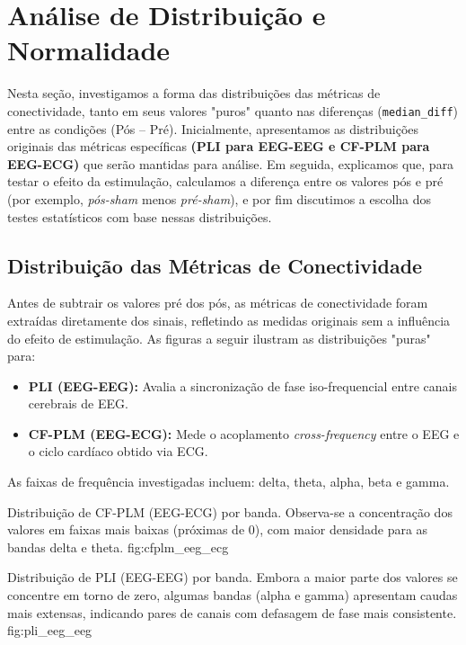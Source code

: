 \chapter{Análise de Distribuição e Normalidade}
\label{chap:analise_distribuicao_normalidade}

Nesta seção, investigamos a forma das distribuições das métricas de conectividade, tanto em seus valores "puros" quanto nas diferenças (\texttt{median\_diff}) entre as condições (Pós – Pré). Inicialmente, apresentamos as distribuições originais das métricas específicas \textbf{(PLI para EEG-EEG e CF-PLM para EEG-ECG)} que serão mantidas para análise. Em seguida, explicamos que, para testar o efeito da estimulação, calculamos a diferença entre os valores pós e pré (por exemplo, \emph{pós-sham} menos \emph{pré-sham}), e por fim discutimos a escolha dos testes estatísticos com base nessas distribuições.

\section{Distribuição das Métricas de Conectividade}

Antes de subtrair os valores pré dos pós, as métricas de conectividade foram extraídas diretamente dos sinais, refletindo as medidas originais sem a influência do efeito de estimulação. As figuras a seguir ilustram as distribuições "puras" para:

\begin{itemize}
    \item \textbf{PLI (EEG-EEG):} Avalia a sincronização de fase iso-frequencial entre canais cerebrais de EEG.
    \item \textbf{CF-PLM (EEG-ECG):} Mede o acoplamento \emph{cross-frequency} entre o EEG e o ciclo cardíaco obtido via ECG.
\end{itemize}

As faixas de frequência investigadas incluem: delta, theta, alpha, beta e gamma.

{Distribuição de CF-PLM (EEG-ECG) por banda. Observa-se a concentração dos valores em faixas mais baixas (próximas de 0), com maior densidade para as bandas delta e theta.}
{fig:cfplm_eeg_ecg}


{Distribuição de PLI (EEG-EEG) por banda. Embora a maior parte dos valores se concentre em torno de zero, algumas bandas (alpha e gamma) apresentam caudas mais extensas, indicando pares de canais com defasagem de fase mais consistente.}
{fig:pli_eeg_eeg}


